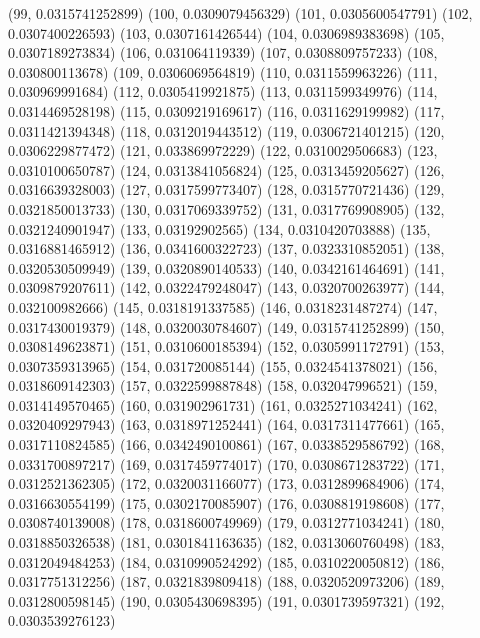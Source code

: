 {					(99, 0.0315741252899)
					(100, 0.0309079456329)
					(101, 0.0305600547791)
					(102, 0.0307400226593)
					(103, 0.0307161426544)
					(104, 0.0306989383698)
					(105, 0.0307189273834)
					(106, 0.031064119339)
					(107, 0.0308809757233)
					(108, 0.030800113678)
					(109, 0.0306069564819)
					(110, 0.0311559963226)
					(111, 0.030969991684)
					(112, 0.0305419921875)
					(113, 0.0311599349976)
					(114, 0.0314469528198)
					(115, 0.0309219169617)
					(116, 0.0311629199982)
					(117, 0.0311421394348)
					(118, 0.0312019443512)
					(119, 0.0306721401215)
					(120, 0.0306229877472)
					(121, 0.033869972229)
					(122, 0.0310029506683)
					(123, 0.0310100650787)
					(124, 0.0313841056824)
					(125, 0.0313459205627)
					(126, 0.0316639328003)
					(127, 0.0317599773407)
					(128, 0.0315770721436)
					(129, 0.0321850013733)
					(130, 0.0317069339752)
					(131, 0.0317769908905)
					(132, 0.0321240901947)
					(133, 0.03192902565)
					(134, 0.0310420703888)
					(135, 0.0316881465912)
					(136, 0.0341600322723)
					(137, 0.0323310852051)
					(138, 0.0320530509949)
					(139, 0.0320890140533)
					(140, 0.0342161464691)
					(141, 0.0309879207611)
					(142, 0.0322479248047)
					(143, 0.0320700263977)
					(144, 0.032100982666)
					(145, 0.0318191337585)
					(146, 0.0318231487274)
					(147, 0.0317430019379)
					(148, 0.0320030784607)
					(149, 0.0315741252899)
					(150, 0.0308149623871)
					(151, 0.0310600185394)
					(152, 0.0305991172791)
					(153, 0.0307359313965)
					(154, 0.031720085144)
					(155, 0.0324541378021)
					(156, 0.0318609142303)
					(157, 0.0322599887848)
					(158, 0.032047996521)
					(159, 0.0314149570465)
					(160, 0.031902961731)
					(161, 0.0325271034241)
					(162, 0.0320409297943)
					(163, 0.0318971252441)
					(164, 0.0317311477661)
					(165, 0.0317110824585)
					(166, 0.0342490100861)
					(167, 0.0338529586792)
					(168, 0.0331700897217)
					(169, 0.0317459774017)
					(170, 0.0308671283722)
					(171, 0.0312521362305)
					(172, 0.0320031166077)
					(173, 0.0312899684906)
					(174, 0.0316630554199)
					(175, 0.0302170085907)
					(176, 0.0308819198608)
					(177, 0.0308740139008)
					(178, 0.0318600749969)
					(179, 0.0312771034241)
					(180, 0.0318850326538)
					(181, 0.0301841163635)
					(182, 0.0313060760498)
					(183, 0.0312049484253)
					(184, 0.0310990524292)
					(185, 0.0310220050812)
					(186, 0.0317751312256)
					(187, 0.0321839809418)
					(188, 0.0320520973206)
					(189, 0.0312800598145)
					(190, 0.0305430698395)
					(191, 0.0301739597321)
					(192, 0.0303539276123)
}
